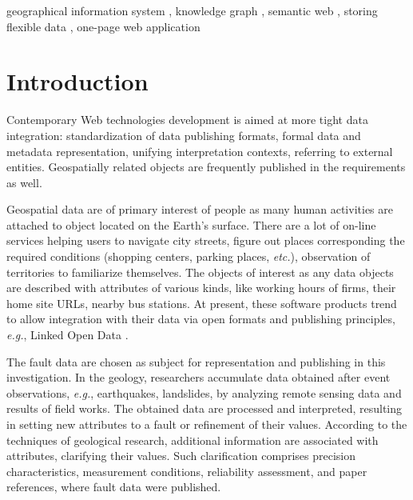 \documentclass[
]{ceurart}
\begin{document}
\begin{keywords}
  geographical information system \sep
  knowledge graph \sep
  semantic web \sep
  storing flexible data \sep
  one-page web application
\end{keywords}

\maketitle

\section{Introduction}

Contemporary Web technologies development is aimed at more tight data integration: standardization of data publishing formats, formal data and metadata representation, unifying interpretation contexts, referring to external entities.  Geospatially related objects are frequently published in the requirements as well.

Geospatial data are of primary interest of people as many human activities are attached to object located on the Earth's surface.  There are a lot of on-line services helping users to navigate city streets, figure out places corresponding the required conditions (shopping centers, parking places, \emph{etc.}), observation of territories to familiarize themselves.  The objects of interest as any data objects are described with attributes of various kinds, like working hours of firms, their home site URLs, nearby bus stations.  At present, these software products trend to allow integration with their data via open formats and publishing principles, \emph{e.g.}, Linked Open Data \cite{lod}.

The fault data \cite{lunina} are chosen as subject for representation and publishing in this investigation.  In the geology, researchers accumulate data obtained after event observations, \emph{e.g.}, earthquakes, landslides, by analyzing remote sensing data and results of field works.  The obtained data are processed and interpreted, resulting in setting new attributes to a fault or refinement of their values.  According to the techniques of geological research, additional information are associated with attributes, clarifying their values.  Such clarification comprises precision characteristics, measurement conditions, reliability assessment, and paper references, where fault data were published.
\end{document}
